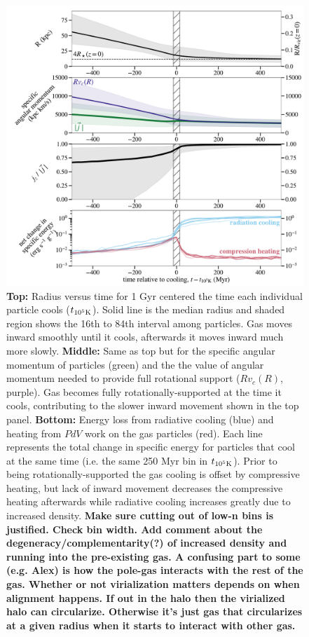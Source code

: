 \documentclass[fleqn,usenatbib]{mnras}
\begin{document}
\begin{figure}
\includegraphics[width=\textwidth]{figures/rad_vs_compress.pdf}
\caption{
\textbf{Top:}
Radius versus time for 1 Gyr centered the time each individual particle cools ($t_{\rm 10^5 K}$).
Solid line is the median radius and shaded region shows the 16th to 84th interval among particles.
Gas moves inward smoothly until it cools, afterwards it moves inward much more slowly.
\textbf{Middle:}
Same as top but for the specific angular momentum of particles (green) and the the value of angular momentum needed to provide full rotational support ($Rv_c(R)$, purple).
Gas becomes fully rotationally-supported at the time it cools, contributing to the slower inward movement shown in the top panel.
\textbf{Bottom:}
Energy loss from radiative cooling (blue) and heating from $PdV$ work on the gas particles (red).
Each line represents the total change in specific energy for particles that cool at the same time (i.e. the same 250 Myr bin in $t_{\rm 10^5 K}$).
Prior to being rotationally-supported the gas cooling is offset by compressive heating, but lack of inward movement decreases the compressive heating afterwards while radiative cooling increases greatly due to increased density.
\textbf{
Make sure cutting out of low-n bins is justified.
Check bin width.
Add comment about the degeneracy/complementarity(?) of increased density and running into the pre-existing gas.
A confusing part to some (e.g. Alex) is how the pole-gas interacts with the rest of the gas.
Whether or not virialization matters depends on when alignment happens. If out in the halo then the virialized halo can circularize. Otherwise it's just gas that circularizes at a given radius when it starts to interact with other gas.
}
}
\label{f:before_after_cooling}
\end{figure}
\end{document}
